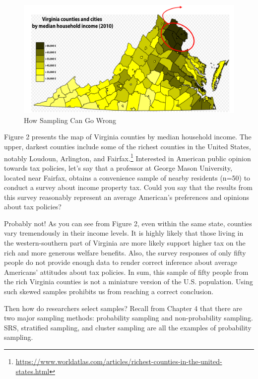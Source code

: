 \documentclass{book}
\begin{document}
\begin{figure}
\hypertarget{fig:Virginia_sampling}{%
\centering
\includegraphics{images/surveys/Virginia_sampling.png}
\caption{How Sampling Can Go Wrong}\label{fig:Virginia_sampling}
}
\end{figure}

Figure 2 presents the map of Virginia counties by median household income. The
upper, darkest counties include some of the richest counties in the United
States, notably Loudoun, Arlington, and Fairfax.\footnote{\url{https://www.worldatlas.com/articles/richest-counties-in-the-united-states.html}}
Interested in American public opinion towards tax policies, let's say that a
professor at George Mason University, located near Fairfax, obtains a
convenience sample of nearby residents (n=50) to conduct a survey about income
property tax. Could you say that the results from this survey reasonably
represent an average American's preferences and opinions about tax policies?

Probably not! As you can see from Figure 2, even within the same state,
counties vary tremendously in their income levels. It is highly likely that
those living in the western-southern part of Virginia are more likely support
higher tax on the rich and more generous welfare benefits. Also, the survey
responses of only fifty people do not provide enough data to render correct
inference about average Americans' attitudes about tax policies. In sum, this
sample of fifty people from the rich Virginia counties is not a miniature
version of the U.S. population. Using such skewed samples prohibits us from
reaching a correct conclusion.

Then how do researchers select samples? Recall from Chapter 4 that there are
two major sampling methods: probability sampling and non-probability sampling.
SRS, stratified sampling, and cluster sampling are all the examples of
probability sampling.
\end{document}
